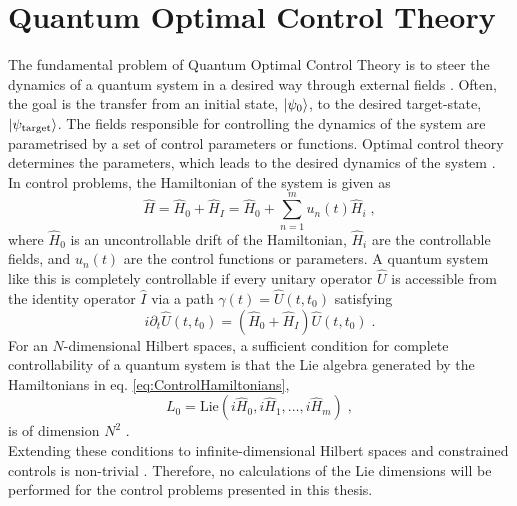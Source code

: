 \chapter{Quantum Optimal Control Theory}
The fundamental problem of Quantum Optimal Control Theory is to steer the dynamics of a quantum system in a desired way through external fields \cite{Rice2000,Shapiro2003}. Often, the goal is the transfer from an initial state, $\ket{\psi_0}$, to the desired target-state, $\ket{\psi_{\mathrm{target}}}$. The fields responsible for controlling the dynamics of the system are parametrised by a set of control parameters or functions. Optimal control theory determines the parameters, which leads to the desired dynamics of the system \cite{Werschnik2007}.\\ 
In control problems, the Hamiltonian of the system is given as
\begin{equation}
	\hat{H} = \hat{H}_0 + \hat{H}_I = \hat{H}_0 + \sum_{n = 1}^{m} u_n(t) \hat{H}_i \; ,
	\label{eq:ControlHamiltonians}
\end{equation} 
where $\hat{H}_0$ is an uncontrollable drift of the Hamiltonian, $\hat{H}_i$ are the controllable fields, and $u_n(t)$ are the control functions or parameters. A quantum system like this is completely controllable if every unitary operator $\hat{U}$ is accessible from the identity operator $\hat{I}$ via a path $\gamma (t) = \hat{U}(t, t_0)$ satisfying \cite{Schirmer2001}
\begin{equation}
	i \partial_t \hat{U}(t, t_0) = \left( \hat{H}_0 + \hat{H}_I \right) \hat{U}(t, t_0) \; .
\end{equation} 
For an $N$-dimensional Hilbert spaces, a sufficient condition for complete controllability of a quantum system is that the Lie algebra generated by the Hamiltonians in eq. \eqref{eq:ControlHamiltonians},
\begin{equation}
	L_0 = \mathrm{Lie} \left( i \hat{H}_0, i \hat{H}_1 , \ldots , i \hat{H}_m \right) \; ,
\end{equation}
is of dimension $N^2$ \cite{Ramakrishna1995}.\\
Extending these conditions to infinite-dimensional Hilbert spaces and constrained controls is non-trivial \cite{Huang1983}. Therefore, no calculations of the Lie dimensions will be performed for the control problems presented in this thesis.


